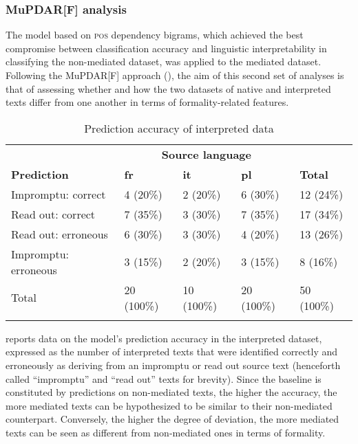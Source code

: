 \documentclass[output=paper]{langscibook}
\begin{document}
\subsubsection{MuPDAR[F] analysis}\label{sec:ivaska:4.2.2}

The model based on \textsc{pos} dependency bigrams, which achieved the best compromise between classification accuracy and linguistic interpretability in classifying the non-mediated dataset, was applied to the mediated dataset. Following the MuPDAR[F] approach (\citealt{GriesDeshors2020}), the aim of this second set of analyses is that of assessing whether and how the two datasets of native and interpreted texts differ from one another in terms of formality-related features. 

\begin{table}
\small
\begin{tabularx}{\textwidth}{lXXXX}
\lsptoprule
& \multicolumn{3}{c}{{\bfseries Source language}} & \\
{\bfseries Prediction} & {\bfseries fr} & {\bfseries it} & {\bfseries pl} & {\bfseries Total}\\
\midrule
Impromptu: correct & 4 (20\%) & 2 (20\%) & 6 (30\%) & 12 (24\%)\\
Read out: correct & 7 (35\%) & 3 (30\%) & 7 (35\%) & 17 (34\%)\\
Read out: erroneous & 6 (30\%) & 3 (30\%) & 4 (20\%) & 13 (26\%)\\
Impromptu: erroneous & 3 (15\%) & 2 (20\%) & 3 (15\%) & 8 (16\%)\\
\midrule
Total & 20 (100\%) & 10 (100\%) & 20 (100\%) & 50 (100\%)\\
\lspbottomrule
\end{tabularx}

\caption{Prediction accuracy of interpreted data}
\label{tab:ivaska:7}
\end{table}

 reports data on the model’s prediction accuracy in the interpreted dataset, expressed as the number of interpreted texts that were identified correctly and erroneously as deriving from an impromptu or read out source text (henceforth called “impromptu” and “read out” texts for brevity). Since the baseline is constituted by predictions on non-mediated texts, the higher the accuracy, the more mediated texts can be hypothesized to be similar to their non-mediated counterpart. Conversely, the higher the degree of deviation, the more mediated texts can be seen as different from non-mediated ones in terms of formality.
\end{document}

